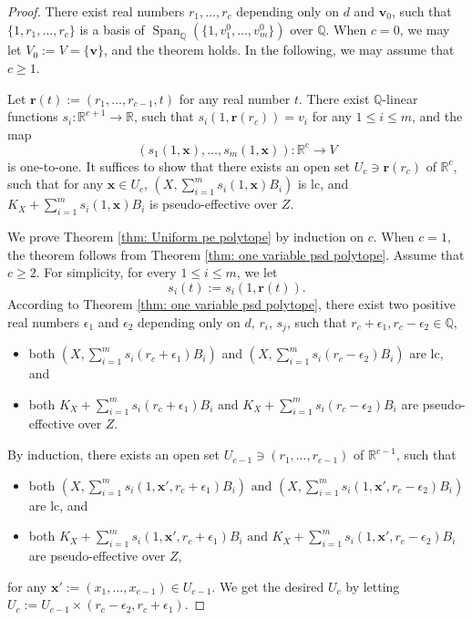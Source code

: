 \documentclass[11pt]{amsart}
\numberwithin{equation}{section}
\newcommand{\Qq}{\mathbb{Q}}
\newcommand{\Rr}{\mathbb{R}}
\newcommand{\Span}{\operatorname{Span}}
\theoremstyle{definition}
\theoremstyle{definition}
\begin{document}
\begin{proof}
There exist real numbers $r_1,\ldots,r_c$ depending only on $d$ and $\bm{v}_0$, such that $\{1,r_1,\ldots,r_{c}\}$ is a basis of $\Span_{\Qq}(\{1,v^0_1,\ldots,v^0_{m}\})$ over $\Qq$. When $c=0$, we may let $V_0:=V=\{\bm{v}\}$, and the theorem holds. In the following, we may assume that $c\geq 1$. 

Let $\bm{r}(t):=(r_1,\dots,r_{c-1},t)$ for any real number $t$. There exist $\Qq$-linear functions $s_i:\Rr^{c+1}\to \Rr$, such that $s_i(1,\bm{r}(r_c))=v_i$ for any $1\le i\le m$, and the map
$$(s_1(1,\bm{x}),\ldots,s_m(1,\bm{x})):\Rr^{c}\to V$$
is one-to-one. It suffices to show that there exists an open set $U_c\ni\bm{r}(r_c)$ of $\Rr^{c}$, such that for any $\bm{x}\in U_c$, $(X,\sum_{i=1}^m s_i(1,\bm{x})B_{i})$ is lc, and $K_X+\sum_{i=1}^m s_i(1,\bm{x})B_{i}$ is pseudo-effective over $Z$.

We prove Theorem \ref{thm: Uniform pe polytope} by induction on $c$. When $c=1$, the theorem follows from Theorem \ref{thm: one variable psd polytope}. Assume that $c\ge 2$. For simplicity, for every $1\leq i\leq m$, we let
$$s_i(t):=s_i(1,\bm{r}(t)).$$ 
According to Theorem \ref{thm: one variable psd polytope}, there 
exist two positive real numbers $\epsilon_1$ and $\epsilon_2$ depending only on $d$, $r_i$, $s_j$, such that $r_c+\epsilon_1,r_c-\epsilon_2\in\Qq$,
\begin{itemize}
    \item both $(X,\sum_{i=1}^m s_i(r_c+\epsilon_1)B_i)$ and $(X,\sum_{i=1}^m s_i(r_c-\epsilon_2)B_i)$ are lc, and
    \item both $K_X+\sum_{i=1}^m s_i(r_c+\epsilon_1)B_i$ and $K_X+\sum_{i=1}^m s_i(r_c-\epsilon_2)B_i$ are pseudo-effective over $Z$.
\end{itemize}
By induction, there exists an open set $U_{c-1}\ni (r_1,\ldots,r_{c-1})$ of $\Rr^{c-1}$, such that
\begin{itemize}
    \item both $(X,\sum_{i=1}^m s_i(1,\bm{x}',r_{c}+\epsilon_1)B_{i})\text{ and }(X,\sum_{i=1}^m s_i(1,\bm{x}',r_{c}-\epsilon_2)B_{i})$ are lc, and
    \item both $K_X+\sum_{i=1}^m s_i(1,\bm{x}',r_{c}+\epsilon_1)B_{i}\text{ and }K_X+\sum_{i=1}^m s_i(1,\bm{x}',r_{c}-\epsilon_2)B_{i}$ are pseudo-effective over $Z$,
\end{itemize}
for any $\bm{x}':=(x_1,\ldots,x_{c-1})\in U_{c-1}$. We get the desired $U_c$ by letting $U_c:=U_{c-1}\times (r_{c}-\epsilon_2,r_{c}+\epsilon_1)$.
\end{proof}
\end{document}
